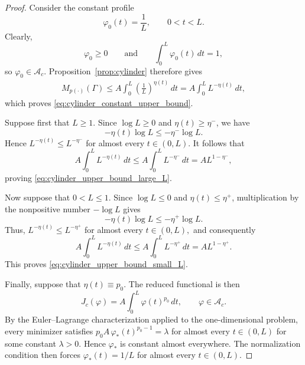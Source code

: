 \documentclass[12pt]{amsart}
\numberwithin{equation}{section}
\theoremstyle{plain}
\theoremstyle{definition}
\begin{document}
\begin{proof}
Consider the constant profile
\begin{equation*}
\varphi_0(t)=\frac1L,
\qquad 0<t<L.
\end{equation*}
Clearly,
\begin{equation*}
\varphi_0\ge0
\qquad\text{and}\qquad
\int_0^L\varphi_0(t)\,dt=1,
\end{equation*}
so $\varphi_0\in\mathcal A_c$. Proposition~\ref{prop:cylinder}
therefore gives
\begin{align}
M_{p(\cdot)}(\Gamma)
\le
A\int_0^L
\left(\frac1L\right)^{\eta(t)}\,dt
=
A\int_0^L L^{-\eta(t)}\,dt,
\end{align}
which proves \eqref{eq:cylinder_constant_upper_bound}.

Suppose first that $L\ge1$. Since $\log L\ge0$ and $\eta(t)\ge\eta^-$,
we have
\begin{equation*}
-\eta(t)\log L
\le
-\eta^-\log L.
\end{equation*}
Hence $L^{-\eta(t)}
\le
L^{-\eta^-}$
for almost every $t\in(0,L)$.
It follows that
\begin{equation*}
A\int_0^L L^{-\eta(t)}\,dt
\le
A\int_0^L L^{-\eta^-}\,dt
=
A L^{1-\eta^-},
\end{equation*}
proving \eqref{eq:cylinder_upper_bound_large_L}.

Now suppose that $0<L\le1$. Since $\log L\le0$ and
$\eta(t)\le\eta^+$,
multiplication by the nonpositive number $-\log L$ gives
\begin{equation*}
-\eta(t)\log L
\le
-\eta^+\log L.
\end{equation*}
Thus, $L^{-\eta(t)}
\le
L^{-\eta^+}$ for almost every $t\in(0,L),$
and consequently
\begin{equation*}
A\int_0^L L^{-\eta(t)}\,dt
\le
A\int_0^L L^{-\eta^+}\,dt
=
A L^{1-\eta^+}.
\end{equation*}
This proves \eqref{eq:cylinder_upper_bound_small_L}.

Finally, suppose that
$\eta(t)\equiv p_0$.
The reduced functional is then
\begin{equation*}
J_c(\varphi)
=
A\int_0^L\varphi(t)^{p_0}\,dt,
\qquad
\varphi\in\mathcal A_c.
\end{equation*}
By the Euler--Lagrange characterization applied to the one-dimensional
problem, every minimizer satisfies $p_0 A\,\varphi_*(t)^{p_0-1}
=
\lambda$ for almost every $t\in(0,L)$
for some constant $\lambda>0$. Hence $\varphi_*$ is constant almost
everywhere. The normalization condition then forces $\varphi_*(t)=1/L$ for almost every $t\in(0,L).$



\end{proof}
\end{document}
